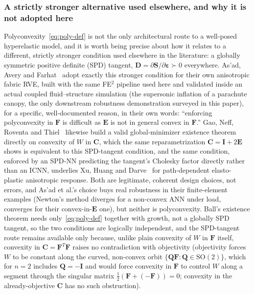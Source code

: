 \documentclass[10pt,a4paper]{article}
\newcommand{\SO}{\mathrm{SO}(2)}
\begin{document}
\subsubsection{A strictly stronger alternative used elsewhere, and why it is not adopted here}
\label{sec:c5-wrong}
Polyconvexity~\eqref{eq:poly-def} is not the only architectural route to
a well-posed hyperelastic model, and it is worth being precise about how
it relates to a different, strictly stronger condition used elsewhere in
the literature: a globally symmetric positive definite (SPD) tangent,
$\bm D=\partial\bm S/\partial\bm\varepsilon\succ0$ everywhere.
\label{sec:related-asad}As'ad, Avery and Farhat~\cite{Asad2022} adopt
exactly this stronger condition for their own anisotropic fabric RVE,
built with the same FE$^2$ pipeline used here and validated inside an
actual coupled fluid--structure simulation (the supersonic inflation of a
parachute canopy, the only downstream robustness demonstration surveyed
in this paper), for a specific, well-documented reason, in their own
words: ``enforcing polyconvexity in $\bm F$ is difficult as $\bm E$ is
not in general convex in $\bm F$.'' Gao, Neff, Roventa and
Thiel~\cite{GaoNeffRoventaThiel2017} likewise build a valid
global-minimizer existence theorem directly on convexity of $W$ in $\bm C$,
which the same reparametrization $\bm C=\bm I+2\bm E$ shows is equivalent to this
SPD-tangent condition, and the same condition, enforced by an SPD-NN
predicting the tangent's Cholesky factor directly rather than an ICNN,
underlies Xu, Huang and Darve~\cite{Xu2021} for path-dependent
elasto-plastic anisotropic response. Both are legitimate, coherent design
choices, not errors, and As'ad et al.'s choice buys real robustness in
their finite-element examples (Newton's method diverges for a non-convex
ANN under load, converges for their convex-in-$\bm E$ one), but neither
is polyconvexity. Ball's existence theorem needs
only~\eqref{eq:poly-def} together with growth, not a globally SPD
tangent, so the two conditions are logically independent, and the
SPD-tangent route remains available only because, unlike plain convexity
of $W$ in $\bm F$ itself, convexity in $\bm C=\bm F^T\bm F$ raises no contradiction with
objectivity (objectivity forces $W$ to be constant along the curved,
non-convex orbit $\{\bm Q\bm F:\bm Q\in\SO\}$, which for $n=2$ includes $\bm Q=-\bm I$ and
would force convexity in $\bm F$ to control $W$ along a segment through the
singular matrix $\tfrac12(\bm F+(-\bm F))=0$; convexity in the already-objective
$\bm C$ has no such obstruction).
\end{document}
